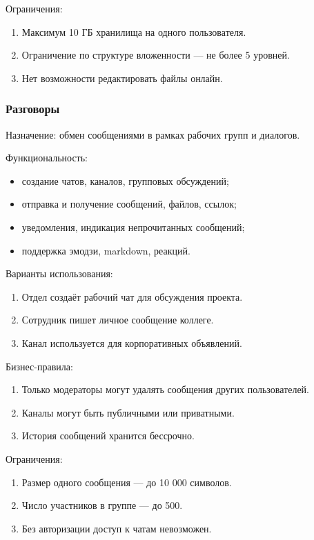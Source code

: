 Ограничения:
\begin{enumerate}
  \item Максимум 10 ГБ хранилища на одного пользователя.
  \item Ограничение по структуре вложенности — не более 5 уровней.
  \item Нет возможности редактировать файлы онлайн.
\end{enumerate}

\subsubsection{Разговоры}

Назначение: обмен сообщениями в рамках рабочих групп и диалогов.

Функциональность:
\begin{itemize}
  \item создание чатов, каналов, групповых обсуждений;
  \item отправка и получение сообщений, файлов, ссылок;
  \item уведомления, индикация непрочитанных сообщений;
  \item поддержка эмодзи, markdown, реакций.
\end{itemize}

Варианты использования:
\begin{enumerate}
  \item Отдел создаёт рабочий чат для обсуждения проекта.
  \item Сотрудник пишет личное сообщение коллеге.
  \item Канал используется для корпоративных объявлений.
\end{enumerate}

Бизнес-правила:
\begin{enumerate}
  \item Только модераторы могут удалять сообщения других пользователей.
  \item Каналы могут быть публичными или приватными.
  \item История сообщений хранится бессрочно.
\end{enumerate}

Ограничения:
\begin{enumerate}
  \item Размер одного сообщения — до 10 000 символов.
  \item Число участников в группе — до 500.
  \item Без авторизации доступ к чатам невозможен.
\end{enumerate}

